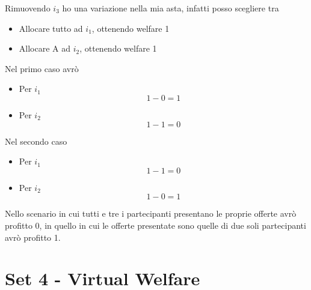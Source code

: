 \documentclass{article}
\begin{document}
            Rimuovendo $ i_3 $ ho una variazione nella mia asta, infatti posso scegliere tra
            \begin{itemize}
                \item Allocare tutto ad $ i_1 $, ottenendo welfare 1
                \item Allocare A ad $ i_2 $, ottenendo welfare 1
            \end{itemize}
            Nel primo caso avrò
            \begin{itemize}
                \item Per $ i_1 $
                      \[
                        1 - 0 = 1    
                      \]
                \item Per $ i_2 $
                      \[
                        1 - 1 = 0    
                      \]
            \end{itemize}
            Nel secondo caso
            \begin{itemize}
                \item Per $ i_1 $
                      \[
                        1 - 1 = 0    
                      \]
                \item Per $ i_2 $
                      \[
                        1 - 0 = 1    
                      \]
            \end{itemize}
            Nello scenario in cui tutti e tre i partecipanti presentano le proprie offerte avrò profitto 0, in quello in cui le offerte presentate sono quelle di due soli partecipanti avrò profitto 1.
    \newpage
    \section{Set 4 - Virtual Welfare}
\end{document}

